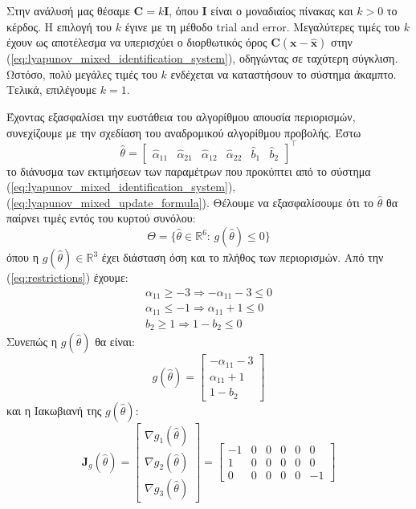 \documentclass[a4paper,12pt]{article}
\begin{document}
Στην ανάλυσή μας θέσαμε $\mathbf{C} = k \mathbf{I}$, όπου $\mathbf{I}$ είναι ο μοναδιαίος πίνακας και 
$k > 0$ το κέρδος. Η επιλογή του $k$ έγινε με τη μέθοδο 
trial and error. Μεγαλύτερες τιμές του $k$ έχουν ως 
αποτέλεσμα να υπερισχύει ο διορθωτικός όρος $\mathbf{C}(\mathbf{x} - \hat{\mathbf{x}})$ στην 
(\ref{eq:lyapunov_mixed_identification_system}), οδηγώντας σε ταχύτερη σύγκλιση. Ωστόσο, πολύ μεγάλες 
τιμές του $k$ ενδέχεται να καταστήσουν το σύστημα άκαμπτο. Τελικά, επιλέγουμε $k = 1$.

Έχοντας εξασφαλίσει την ευστάθεια του αλγορίθμου απουσία περιορισμών, συνεχίζουμε με την σχεδίαση του
αναδρομικού αλγορίθμου προβολής. Έστω
\[
\hat{\theta} =
\begin{bmatrix}
    \hat{\alpha}_{11} & \hat{\alpha}_{21} & \hat{\alpha}_{12} & \hat{\alpha}_{22} & \hat{b}_1 & \hat{b}_2
\end{bmatrix}^{\top}
\]
το διάνυσμα των εκτιμήσεων των παραμέτρων που προκύπτει από το σύστημα (\ref{eq:lyapunov_mixed_identification_system}), (\ref{eq:lyapunov_mixed_update_formula}). 
Θέλουμε να εξασφαλίσουμε ότι το $\hat{\theta}$ θα παίρνει τιμές εντός του κυρτού συνόλου:
\[
\Theta = \{\hat{\theta} \in \mathbb{R}^6:\, g(\hat{\theta}) \leq 0\}
\]
όπου η $g(\hat{\theta}) \in \mathbb{R}^3$ έχει διάσταση όση και το πλήθος των περιορισμών.
Από την (\ref{eq:restrictions}) έχουμε:
\[
\begin{aligned}
    \alpha_{11} \ge -3 \Rightarrow - \alpha_{11} - 3 \le 0 \\
    \alpha_{11} \le -1 \Rightarrow \alpha_{11} + 1 \le 0 \\
    b_2 \ge 1 \Rightarrow 1 - b_2 \le 0
\end{aligned}
\]
Συνεπώς η $g(\hat{\theta})$ θα είναι:
\[
    g(\hat{\theta}) = 
    \begin{bmatrix}
        - \alpha_{11} - 3 \\
        \alpha_{11} + 1 \\
        1 - b_2
    \end{bmatrix}
\]
και η Ιακωβιανή της $g(\hat{\theta})$:
\[
    \mathbf{J}_g(\hat{\theta}) = 
    \begin{bmatrix}
         \nabla g_1(\hat{\theta}) \\
         \nabla g_2(\hat{\theta}) \\
         \nabla g_3(\hat{\theta})
    \end{bmatrix} = 
    \begin{bmatrix}
        -1 & 0 & 0 & 0 & 0 & 0 \\
        1 & 0 & 0 & 0 & 0 & 0 \\
        0 & 0 & 0 & 0 & 0 & -1
    \end{bmatrix}
\]
\end{document}
